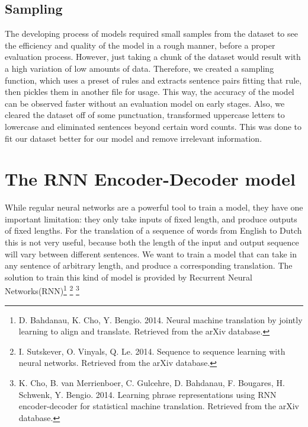 \documentclass[11pt]{article}
\begin{document}
\subsection{Sampling}
The developing process of models required small samples from the dataset to see the efficiency and quality of the model in a rough manner, before a proper evaluation process. However, just taking a chunk of the dataset would result with a high variation of low amounts of data. Therefore, we created a sampling function, which uses a preset of rules and extracts sentence pairs fitting that rule, then pickles them in another file for usage. This way, the accuracy of the model can be observed faster without an evaluation model on early stages. Also, we cleared the dataset off of some punctuation, transformed uppercase letters to lowercase and eliminated sentences beyond certain word counts. This was done to fit our dataset better for our model and remove irrelevant information.

\section{The RNN Encoder-Decoder model}
While regular neural networks are a powerful tool to train a model, they have one important limitation: they only take inputs of fixed length, and produce outputs of fixed lengths. For the translation of a sequence of words from English to Dutch this is not very useful, because both the length of the input and output sequence will vary between different sentences. We want to train a model that can take in any sentence of arbitrary length, and produce a corresponding translation. The solution to train this kind of model is provided by Recurrent Neural Networks(RNN)\footnote[3]{D. Bahdanau, K. Cho, Y. Bengio. 2014. Neural machine translation by jointly learning to align and translate. Retrieved from the arXiv database.} \footnote[4]{ I. Sutskever, O. Vinyals, Q. Le. 2014. Sequence to sequence learning with neural networks. Retrieved from the arXiv database.} \footnote[5]{K. Cho, B. van Merrienboer, C. Gulcehre, D. Bahdanau, F. Bougares, H. Schwenk, Y. Bengio. 2014. Learning phrase representations using RNN encoder-decoder for statistical machine translation. Retrieved from the arXiv database.}
\end{document}
